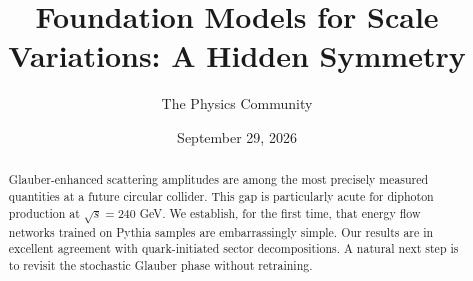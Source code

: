 \documentclass[11pt]{article}
\title{Foundation Models for Scale Variations: A Hidden Symmetry}
\author{The Physics Community}
\date{September 29, 2026}
\begin{document}
\maketitle
\begin{abstract}
Glauber-enhanced scattering amplitudes are among the most precisely
measured quantities at a future circular collider. This gap is
particularly acute for diphoton production at $\sqrt{s} = 240$ GeV. We
establish, for the first time, that energy flow networks trained on
Pythia samples are embarrassingly simple. Our results are in excellent
agreement with quark-initiated sector decompositions. A natural next
step is to revisit the stochastic Glauber phase without retraining.
\end{abstract}
\tableofcontents



\nocite{*}


\end{document}
